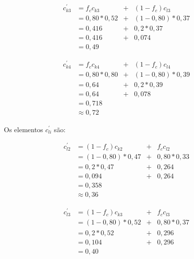 	
	\begin{equation}
		\begin{array}{llcl}
			c^{'}_{k3}	& = f_c c_{k3} 		& + & (1- f_c) c_{l3} \\
									& = 0,80 * 0,52		& + &	(1 - 0,80) * 0,37 \\
									& = 0,416					& + & 0,2 * 0,37	\\
									& = 0,416					& + & 0,074	\\
									& = 0,49
		\end{array}
	\end{equation}
	
	
	\begin{equation}
		\begin{array}{llcl}
			c^{'}_{k4}	& = f_c c_{k4} 		& + & (1- f_c) c_{l4} \\
									& = 0,80 * 0,80		& + &	(1 - 0,80) * 0,39 \\
									& = 0,64					& + & 0,2 * 0,39	\\
									& = 0,64					& + & 0,078	\\
									& = 0,718 \\
									& \approx 0,72
		\end{array}
	\end{equation}
	
	
	Os elementos $c^{'}_{li}$ são:
	
	\begin{equation}
		\begin{array}{llcl}
			c^{'}_{l2}	& = (1 - f_c) c_{k2} 		& + & f_c c_{l2} \\
									& = (1 - 0,80) * 0,47		& + &	0,80 * 0,33 \\
									& = 0,2 * 0,47					& + & 0,264	\\
									& = 0,094					& + & 0,264	\\
									& = 0,358 \\
									& \approx 0,36
		\end{array}
	\end{equation}
	
	\begin{equation}
		\begin{array}{llcl}
			c^{'}_{l3}	& = (1 - f_c) c_{k3} 		& + & f_c c_{l3} \\
									& = (1 - 0,80) * 0,52		& + &	0,80 * 0,37 \\
									& = 0,2 * 0,52					& + & 0,296	\\
									& = 0,104								& + & 0,296	\\
									& = 0,40									
		\end{array}
	\end{equation}
	

